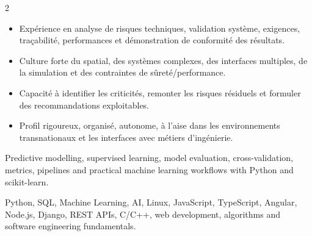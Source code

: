 \documentclass[8pt,a4paper,ragged2e,withhyper]{altacv}
\begin{document}
\begin{paracol}{2}
\begin{itemize}
  \item Expérience en analyse de risques techniques, validation système, exigences, traçabilité, performances et démonstration de conformité des résultats.
  \item Culture forte du spatial, des systèmes complexes, des interfaces multiples, de la simulation et des contraintes de sûreté/performance.
  \item Capacité à identifier les criticités, remonter les risques résiduels et formuler des recommandations exploitables.
  \item Profil rigoureux, organisé, autonome, à l’aise dans les environnements transnationaux et les interfaces avec métiers d’ingénierie.
\end{itemize}


\divider
{}
\divider

\medskip



\divider


\divider


\divider




\small{
Predictive modelling, supervised learning, model evaluation, cross-validation, metrics, pipelines and practical machine learning workflows with Python and scikit-learn.
}

\divider


\divider


\divider


\small{
Python, SQL, Machine Learning, AI, Linux, JavaScript, TypeScript, Angular, Node.js, Django, REST APIs, C/C++, web development, algorithms and software engineering fundamentals.
}

\end{paracol}
\end{document}
